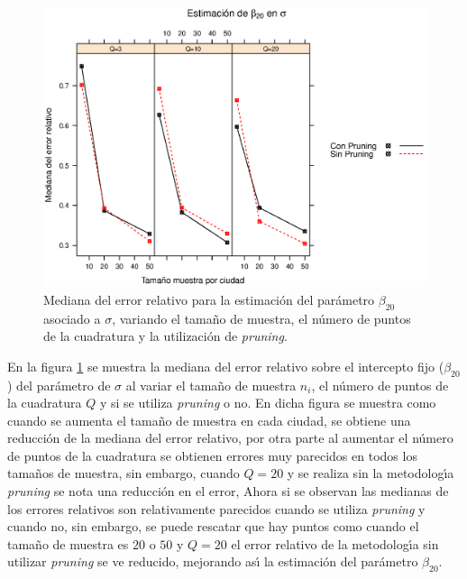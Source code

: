 \begin{figure}
	\begin{center}
		\includegraphics[scale=0.6]{MAPE_beta0_sigma.eps}	
		\caption{Mediana del error relativo para la estimaci\'{o}n del par\'{a}metro $\beta_{20}$ asociado a $\sigma$, variando el tama\~{n}o de muestra, el n\'{u}mero de puntos de la cuadratura y  la utilizaci\'{o}n de \textit{pruning}.}
		\label{MAPE_beta0_sigma}
	\end{center}
\end{figure}

En la figura \ref{MAPE_beta0_sigma} se muestra la mediana del error relativo sobre el intercepto fijo ($\beta_{20}$) del par\'{a}metro de $\sigma$ al variar el tama\~{n}o de muestra $n_i$, el n\'{u}mero de puntos de la cuadratura $Q$ y si se utiliza \textit{pruning} o no. En dicha figura se muestra como cuando se aumenta el tama\~{n}o de muestra en cada ciudad, se obtiene una reducci\'{o}n de la mediana del error relativo, por otra parte al aumentar el n\'{u}mero de puntos de la cuadratura se obtienen errores muy parecidos en todos los tama\~{n}os de muestra, sin embargo, cuando $Q=20$ y se realiza sin la metodolog\'{\i}a \textit{pruning} se nota una reducci\'{o}n en el error, Ahora si se observan las medianas de los errores relativos son relativamente parecidos cuando se utiliza \textit{pruning} y cuando no, sin embargo, se puede rescatar que hay puntos como cuando el tama\~{n}o de muestra es $20$ o $50$ y $Q=20$ el error relativo de la metodolog\'{\i}a sin utilizar \textit{pruning} se ve reducido, mejorando as\'{\i} la estimaci\'{o}n del par\'{a}metro $\beta_{20}$.\\


